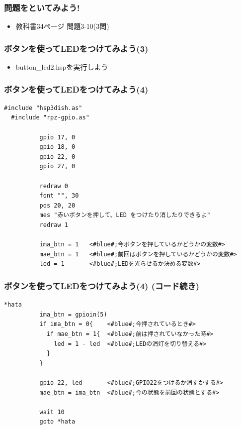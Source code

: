 \begin{frame}
  \frametitle{問題をといてみよう!}
  \begin{itemize}
    \item 教科書34ページ 問題3-10(3問)
  \end{itemize}
\end{frame}

\begin{frame}
  \frametitle{ボタンを使ってLEDをつけてみよう(3)}
    \begin{itemize}
    \item button\_led2.hspを実行しよう
  \end{itemize}
\end{frame}

\begin{frame}[fragile]
  \frametitle{ボタンを使ってLEDをつけてみよう(4)}
  \begin{lstlisting}[title=button\_led2.hsp, label=button_led2.hsp]
  #include "hsp3dish.as"
  #include "rpz-gpio.as"
  
          gpio 17, 0
          gpio 18, 0
          gpio 22, 0
          gpio 27, 0
        
          redraw 0
          font "", 30
          pos 20, 20
          mes "赤いボタンを押して、LED をつけたり消したりできるよ"
          redraw 1

          ima_btn = 1   <#blue#;今ボタンを押しているかどうかの変数#>
          mae_btn = 1   <#blue#;前回はボタンを押しているかどうかの変数#>
          led = 1       <#blue#;LEDを光らせるか決める変数#>
  \end{lstlisting}
\end{frame}

\begin{frame}[fragile]
  \frametitle{ボタンを使ってLEDをつけてみよう(4) (コード続き)}
  \begin{lstlisting}[title=button\_led2.hsp, label=button_led2.hsp]
  *hata
          ima_btn = gpioin(5)
          if ima_btn = 0{    <#blue#;今押されているとき#>
            if mae_btn = 1{  <#blue#;前は押されていなかった時#>
              led = 1 - led  <#blue#;LEDの消灯を切り替える#>
            }
          }

          gpio 22, led       <#blue#;GPIO22をつけるか消すかする#>
          mae_btn = ima_btn  <#blue#;今の状態を前回の状態とする#>

          wait 10
          goto *hata
  \end{lstlisting}
\end{frame}

